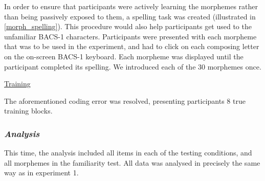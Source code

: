 In order to ensure that participants were actively learning the morphemes rather than being passively exposed to them, a spelling task was created (illustrated in \autoref{morph_spelling}). This procedure would also help participants get used to the unfamiliar BACS-1 characters. Participants were presented with each morpheme that was to be used in the experiment, and had to click on each composing letter on the on-screen BACS-1 keyboard. Each morpheme was displayed until the participant completed its spelling. We introduced each of the 30 morphemes once. 


\noindent \underline{Training}

\noindent
The aforementioned coding error was resolved, presenting participants 8 true training blocks.


\subsubsection{\large{\emph{Analysis}}}
\label{Analysis2}

\noindent
This time, the analysis included all items in each of the testing conditions, and all morphemes in the familiarity test. All data was analysed in precisely the same way as in experiment 1.